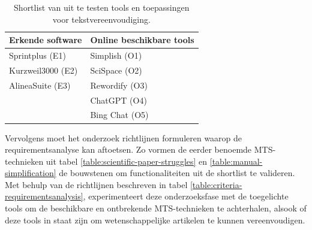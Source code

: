\begin{center}
	\begin{table}[H]
		\begin{tabular}{ | m{6cm} | m{6cm} | } 
			\hline
			\textbf{Erkende software} & \textbf{Online beschikbare tools} \\
			\hline
			Sprintplus (E1) & Simplish (O1) \\
			Kurzweil3000 (E2) & SciSpace (O2) \\ 
			AlineaSuite (E3) & Rewordify (O3) \\
			& ChatGPT (O4) \\
			& Bing Chat (O5) \\
			\hline
		\end{tabular}
		\caption{Shortlist van uit te testen tools en toepassingen voor tekstvereenvoudiging.}
		\label{table:shortlist-tools}	
	\end{table}
\end{center}

Vervolgens moet het onderzoek richtlijnen formuleren waarop de requirementsanalyse kan aftoetsen. Zo vormen de eerder benoemde MTS-technieken uit tabel \ref{table:scientific-paper-struggles} en \ref{table:manual-simplification} de bouwstenen om functionaliteiten uit de shortlist te valideren. Met behulp van de richtlijnen beschreven in tabel \ref{table:criteria-requirementsanalysis}, experimenteert deze onderzoeksfase met de toegelichte tools om de beschikbare en ontbrekende MTS-technieken te achterhalen, alsook of deze tools in staat zijn om wetenschappelijke artikelen te kunnen vereenvoudigen.

